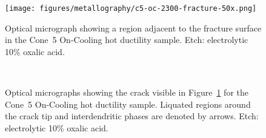 {%

\begin{figure}
    \centering
    \texttt{[image: figures/metallography/c5-oc-2300-fracture-50x.png]}
    \caption{Optical micrograph showing a region adjacent to the fracture surface in the Cone~5 On-Cooling \protect{} hot ductility sample. Etch: electrolytic 10\% oxalic acid.}
    \label{fig:c5-oc-2300-fracture-50x}
\end{figure}

\begin{figure}
    \centering
     \\
    \caption{Optical micrographs showing the crack visible in Figure~\ref{fig:c5-oc-2300-fracture-50x} for the Cone~5 On-Cooling \protect{} hot ductility sample. Liquated regions around the crack tip and interdendritic phases are denoted by arrows. Etch: electrolytic 10\% oxalic acid.}
    \label{fig:c5-oc-2300-crack-olm}
\end{figure}

}
